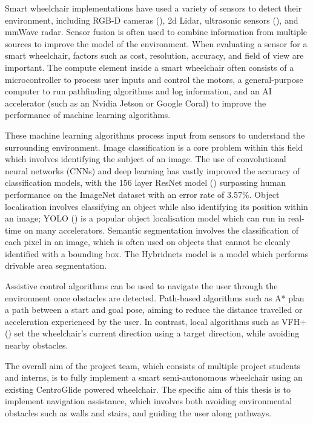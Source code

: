 \documentclass[10pt,twoside]{article}
\begin{document}
Smart wheelchair implementations have used a variety of sensors to detect their environment, including RGB-D cameras (\cite{wangS2P2SelfSupervisedGoalDirected2021}),
2d Lidar, ultrasonic sensors (\cite{levineNavChairAssistiveWheelchair1999}), and mmWave radar.
Sensor fusion is often used to combine information from multiple sources to improve the model of the environment.
When evaluating a sensor for a smart wheelchair, factors such as cost, resolution, accuracy, and field of view are important.
The compute element inside a smart wheelchair often consists of a microcontroller to process user inputs and control the motors,
a general-purpose computer to run pathfinding algorithms and log information, and an AI accelerator (such as an Nvidia Jetson or Google Coral)
to improve the performance of machine learning algorithms.

These machine learning algorithms process input from sensors to understand the surrounding environment.
Image classification is a core problem within this field which involves identifying the subject of an image.
The use of convolutional neural networks (CNNs) and deep learning has vastly improved the accuracy of
classification models, with the 156 layer ResNet model (\cite{heDeepResidualLearning2016}) surpassing human performance
on the ImageNet dataset with an error rate of 3.57\%.
Object localisation involves classifying an object while also identifying its position within an image;
YOLO (\cite{redmonYouOnlyLook2015}) is a popular object localisation model which can run in real-time on many accelerators.
Semantic segmentation involves the classification of each pixel in an image, which is often used
on objects that cannot be cleanly identified with a bounding box.
The Hybridnets model \cite{vuHybridNetsEndtoEndPerception2022} is a model which performs drivable area segmentation.

Assistive control algorithms can be used to navigate the user through the environment once obstacles are detected.
Path-based algorithms such as A*
plan a path between a start and goal pose, aiming to reduce the distance travelled or acceleration experienced by the user.
In contrast, local algorithms such as VFH+ (\cite{ulrichVFHReliableObstacle1998})
set the wheelchair's current direction using a target direction, while avoiding nearby obstacles.

The overall aim of the project team, which consists of multiple project students and interns,
is to fully implement a smart semi-autonomous wheelchair
using an existing CentroGlide powered wheelchair.
The specific aim of this thesis is to implement navigation assistance,
which involves both avoiding environmental obstacles such as walls and stairs,
and guiding the user along pathways.
\end{document}
